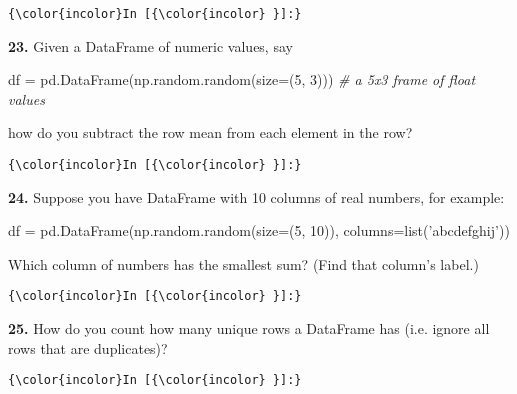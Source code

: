 \documentclass[11pt]{article}
\newenvironment{Shaded}{}{}
\newcommand{\DecValTok}[1]{\textcolor[rgb]{0.25,0.63,0.44}{{#1}}}
\newcommand{\StringTok}[1]{\textcolor[rgb]{0.25,0.44,0.63}{{#1}}}
\newcommand{\CommentTok}[1]{\textcolor[rgb]{0.38,0.63,0.69}{\textit{{#1}}}}
\newcommand{\NormalTok}[1]{{#1}}
\newcommand{\OperatorTok}[1]{\textcolor[rgb]{0.40,0.40,0.40}{{#1}}}
\newcommand{\BuiltInTok}[1]{{#1}}
\begin{document}
    \begin{Verbatim}[commandchars=\\\{\}]
{\color{incolor}In [{\color{incolor} }]:} 
\end{Verbatim}


    \textbf{23.} Given a DataFrame of numeric values, say

\begin{Shaded}
\begin{Highlighting}[]
\NormalTok{df }\OperatorTok{=}\NormalTok{ pd.DataFrame(np.random.random(size}\OperatorTok{=}\NormalTok{(}\DecValTok{5}\NormalTok{, }\DecValTok{3}\NormalTok{))) }\CommentTok{# a 5x3 frame of float values}
\end{Highlighting}
\end{Shaded}

how do you subtract the row mean from each element in the row?

    \begin{Verbatim}[commandchars=\\\{\}]
{\color{incolor}In [{\color{incolor} }]:} 
\end{Verbatim}


    \textbf{24.} Suppose you have DataFrame with 10 columns of real numbers,
for example:

\begin{Shaded}
\begin{Highlighting}[]
\NormalTok{df }\OperatorTok{=}\NormalTok{ pd.DataFrame(np.random.random(size}\OperatorTok{=}\NormalTok{(}\DecValTok{5}\NormalTok{, }\DecValTok{10}\NormalTok{)), columns}\OperatorTok{=}\BuiltInTok{list}\NormalTok{(}\StringTok{'abcdefghij'}\NormalTok{))}
\end{Highlighting}
\end{Shaded}

Which column of numbers has the smallest sum? (Find that column's
label.)

    \begin{Verbatim}[commandchars=\\\{\}]
{\color{incolor}In [{\color{incolor} }]:} 
\end{Verbatim}


    \textbf{25.} How do you count how many unique rows a DataFrame has (i.e.
ignore all rows that are duplicates)?

    \begin{Verbatim}[commandchars=\\\{\}]
{\color{incolor}In [{\color{incolor} }]:} 
\end{Verbatim}
\end{document}
